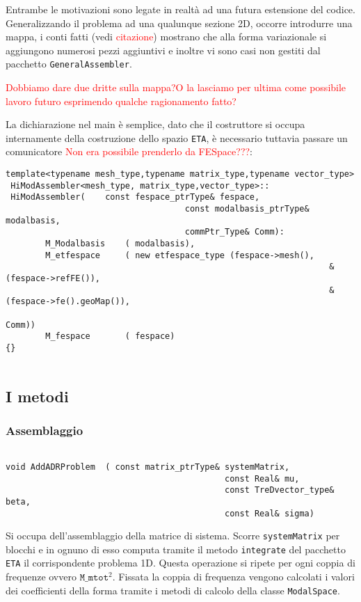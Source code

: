 Entrambe le motivazioni sono legate in realt\`a ad una futura estensione del codice. Generalizzando il problema ad una qualunque sezione 2D, occorre introdurre una mappa, i conti fatti (vedi \textcolor{red}{citazione}) mostrano che alla forma variazionale si aggiungono numerosi pezzi aggiuntivi e inoltre vi sono casi non gestiti dal pacchetto \texttt{GeneralAssembler}.

\textcolor{red}{Dobbiamo dare due dritte sulla mappa?O la lasciamo per ultima come possibile lavoro futuro esprimendo qualche ragionamento fatto?}

La dichiarazione nel main \`e semplice, dato che il costruttore si occupa internamente della costruzione dello spazio \texttt{ETA}, \`e necessario tuttavia passare un comunicatore \textcolor{red}{Non era possibile prenderlo da FESpace???}:

\begin{lstlisting}[style=general]
 template<typename mesh_type,typename matrix_type,typename vector_type>
 HiModAssembler<mesh_type, matrix_type,vector_type>::
 HiModAssembler(	const fespace_ptrType& fespace,
 									const modalbasis_ptrType& modalbasis,
 									commPtr_Type& Comm):
 		M_Modalbasis	( modalbasis),
 		M_etfespace 	( new etfespace_type (fespace->mesh(),
 																 &(fespace->refFE()),
 																 &(fespace->fe().geoMap()),
 																 Comm))
		M_fespace		( fespace)
{} 																 
 																
\end{lstlisting}

\subsection{I metodi}
\subsubsection{Assemblaggio}
\begin{lstlisting}[style=general, frame = top]

void AddADRProblem	( const matrix_ptrType& systemMatrix,
											const Real& mu, 
											const TreDvector_type& beta, 
											const Real& sigma)
\end{lstlisting}

Si occupa dell'assemblaggio della matrice di sistema. Scorre \texttt{systemMatrix} per blocchi e in ognuno di esso computa tramite il metodo \texttt{integrate} del pacchetto \texttt{ETA} il corrispondente problema 1D. Questa operazione si ripete per ogni coppia di frequenze ovvero $\texttt{M\_mtot}^2$. Fissata la coppia di frequenza vengono calcolati i valori dei coefficienti della forma tramite i metodi di calcolo della classe  \texttt{ModalSpace}.



